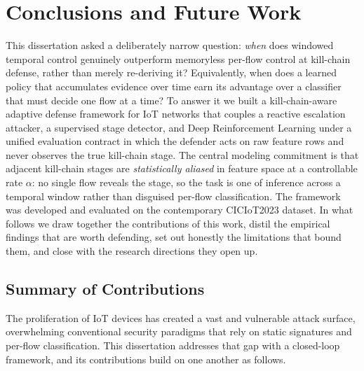 \clearpage
\chapter{Conclusions and Future Work}\label{cap:conclusion}

This dissertation asked a deliberately narrow question: \emph{when} does windowed temporal control genuinely outperform memoryless per-flow control at kill-chain defense, rather than merely re-deriving it? Equivalently, when does a learned policy that accumulates evidence over time earn its advantage over a classifier that must decide one flow at a time? To answer it we built a kill-chain-aware adaptive defense framework for IoT networks that couples a reactive escalation attacker, a supervised stage detector, and Deep Reinforcement Learning under a unified evaluation contract in which the defender acts on raw feature rows and never observes the true kill-chain stage. The central modeling commitment is that adjacent kill-chain stages are \emph{statistically aliased} in feature space at a controllable rate $\alpha$: no single flow reveals the stage, so the task is one of inference across a temporal window rather than disguised per-flow classification. The framework was developed and evaluated on the contemporary CICIoT2023 dataset. In what follows we draw together the contributions of this work, distil the empirical findings that are worth defending, set out honestly the limitations that bound them, and close with the research directions they open up.

\section{Summary of Contributions}\label{sec:summary}
The proliferation of IoT devices has created a vast and vulnerable attack surface, overwhelming conventional security paradigms that rely on static signatures and per-flow classification. This dissertation addresses that gap with a closed-loop framework, and its contributions build on one another as follows.

